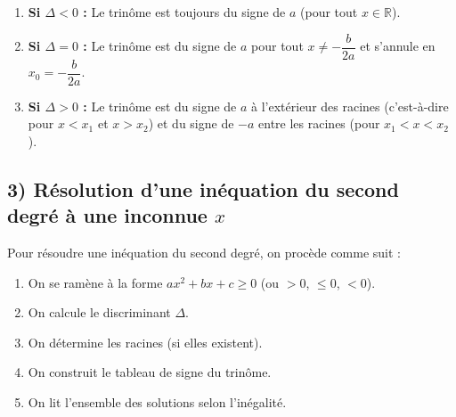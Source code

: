\documentclass[12pt,a4paper]{article}
\newcounter{solution}
\begin{document}
\begin{enumerate}
    \item \textbf{Si $\Delta < 0$ :} 
    Le trinôme est toujours du signe de $a$ (pour tout $x \in \mathbb{R}$).
     
\begin{center}
\end{center}

    \item \textbf{Si $\Delta = 0$ :}
    Le trinôme est du signe de $a$ pour tout $x \neq -\dfrac{b}{2a}$ et s'annule en $x_0 = -\dfrac{b}{2a}$.
    
    \begin{center}
    \end{center}

    \item \textbf{Si $\Delta > 0$ :}
    Le trinôme est du signe de $a$ à l'extérieur des racines (c'est-à-dire pour $x < x_1$ et $x > x_2$) et du signe de $-a$ entre les racines (pour $x_1 < x < x_2$).
    \begin{center}
    \end{center}
\end{enumerate}

\subsection*{\color{myred} 3) Résolution d'une inéquation du second degré à une inconnue $x$}
Pour résoudre une inéquation du second degré, on procède comme suit :
\begin{enumerate}
    \item On se ramène à la forme $ax^2 + bx + c \geq 0$ (ou $>0$, $\leq 0$, $<0$).
    \item On calcule le discriminant $\Delta$.
    \item On détermine les racines (si elles existent).
    \item On construit le tableau de signe du trinôme.
    \item On lit l'ensemble des solutions selon l'inégalité.
\end{enumerate}
\end{document}
